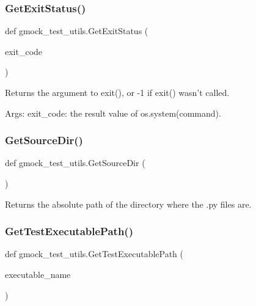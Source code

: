 \subsubsection{\texorpdfstring{Get\+Exit\+Status()}{GetExitStatus()}}
{\footnotesize\ttfamily def gmock\+\_\+test\+\_\+utils.\+Get\+Exit\+Status (\begin{DoxyParamCaption}\item[{}]{exit\+\_\+code }\end{DoxyParamCaption})}

\begin{DoxyVerb}Returns the argument to exit(), or -1 if exit() wasn't called.

Args:
  exit_code: the result value of os.system(command).
\end{DoxyVerb}
 \mbox{\label{namespacegmock__test__utils_ab7217591e655e80392c9db6b99d04765}} 
\subsubsection{\texorpdfstring{Get\+Source\+Dir()}{GetSourceDir()}}
{\footnotesize\ttfamily def gmock\+\_\+test\+\_\+utils.\+Get\+Source\+Dir (\begin{DoxyParamCaption}{ }\end{DoxyParamCaption})}

\begin{DoxyVerb}Returns the absolute path of the directory where the .py files are.\end{DoxyVerb}
 \mbox{\label{namespacegmock__test__utils_aadd2927024e24f0c53f7ba283402cdb1}} 
\subsubsection{\texorpdfstring{Get\+Test\+Executable\+Path()}{GetTestExecutablePath()}}
{\footnotesize\ttfamily def gmock\+\_\+test\+\_\+utils.\+Get\+Test\+Executable\+Path (\begin{DoxyParamCaption}\item[{}]{executable\+\_\+name }\end{DoxyParamCaption})}

